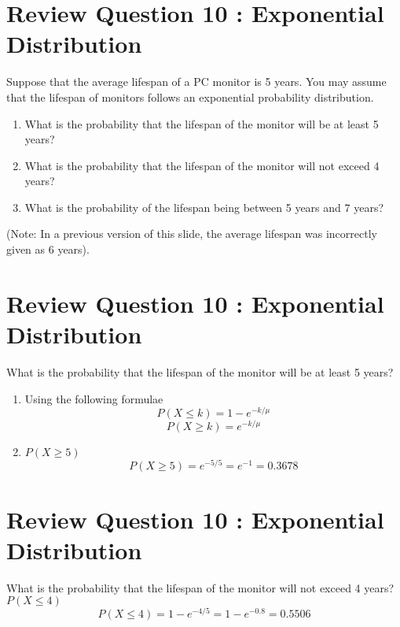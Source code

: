 

\section{Review Question 10 :  Exponential Distribution}
Suppose that the average lifespan of a PC monitor is 5 years. You may assume that the lifespan of monitors follows an exponential probability distribution.
    \begin{enumerate}
    \item What is the probability that the lifespan of the monitor will be at least 5 years?
    \item What is the probability that the lifespan of the monitor will not exceed 4 years?
    \item What is the probability of the lifespan being between 5 years and 7 years?
    \end{enumerate}
(Note: In a previous version of this slide, the average lifespan was incorrectly given as 6 years).


\section{Review Question 10 :  Exponential Distribution}
What is the probability that the lifespan of the monitor will be at least 5 years?
    \begin{enumerate}
    \item Using the following formulae
    \[P(X \leq k) = 1-e^{-k/\mu}\]
    \[P(X \geq k) = e^{-k/\mu}\]
    \item $P(X\geq 5)$
    \[P(X \geq 5) = e^{-5/5} = e^{-1} = 0.3678 \]
    \end{enumerate}



\section{Review Question 10 :  Exponential Distribution}
What is the probability that the lifespan of the monitor will not exceed 4 years?
$P(X\leq 4)$
    \[P(X \leq 4) = 1- e^{-4/5} = 1 - e^{-0.8} = 0.5506 \]




